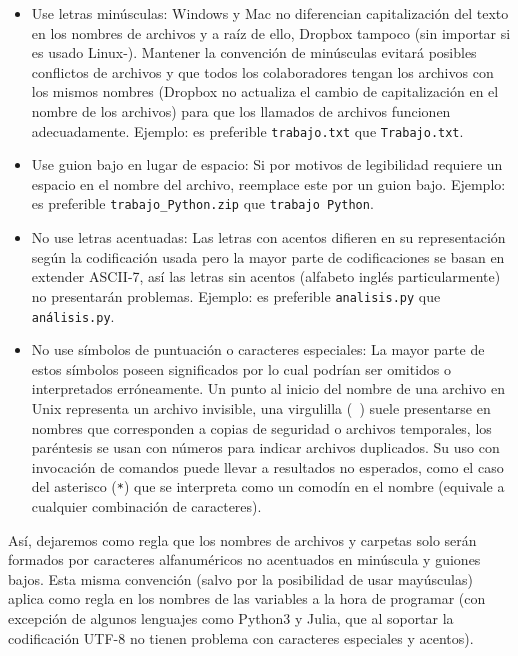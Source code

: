 \begin{itemize}
    \item Use letras minúsculas: Windows y Mac no diferencian capitalización del texto en los nombres de archivos y a raíz de ello, Dropbox
    tampoco (sin importar si es usado Linux-). Mantener la convención de minúsculas evitará posibles conflictos de archivos y
    que todos los colaboradores tengan los archivos con los mismos nombres (Dropbox no actualiza el cambio de capitalización en el nombre de los archivos)
    para que los llamados de archivos funcionen adecuadamente. Ejemplo: es preferible \texttt{trabajo.txt} que \texttt{Trabajo.txt}.
    \item Use guion bajo en lugar de espacio: Si por motivos de legibilidad requiere un espacio en el nombre del archivo, reemplace este por un guion bajo.
    Ejemplo: es preferible \texttt{trabajo\_Python.zip} que \texttt{trabajo Python}.
    \item No use letras acentuadas: Las letras con acentos difieren en su representación según la codificación usada pero la mayor parte de codificaciones
    se basan en extender ASCII-7, así las letras sin acentos (alfabeto inglés particularmente) no presentarán problemas. Ejemplo: es preferible \texttt{analisis.py}
    que \texttt{análisis.py}.
    \item No use símbolos de puntuación o caracteres especiales: La mayor parte de estos símbolos poseen significados por lo cual podrían ser omitidos o interpretados
    erróneamente. Un punto al inicio del nombre de una archivo en Unix representa un archivo invisible, una virgulilla (\texttt{~}) suele presentarse en nombres
    que corresponden a copias de seguridad o archivos temporales, los paréntesis se usan con números para indicar archivos duplicados. Su uso con invocación de comandos
    puede llevar a resultados no esperados, como el caso del asterisco (\texttt{*}) que se interpreta como un comodín en el nombre (equivale a cualquier combinación de caracteres). 
\end{itemize}

Así, dejaremos como regla que los nombres de archivos y carpetas solo serán formados por caracteres alfanuméricos no acentuados en minúscula y guiones bajos.
Esta misma convención (salvo por la posibilidad de usar mayúsculas) aplica como regla en los nombres de las variables a la hora de programar (con excepción
de algunos lenguajes como Python3 y Julia, que al soportar la codificación UTF-8 no tienen problema con caracteres especiales y acentos).

